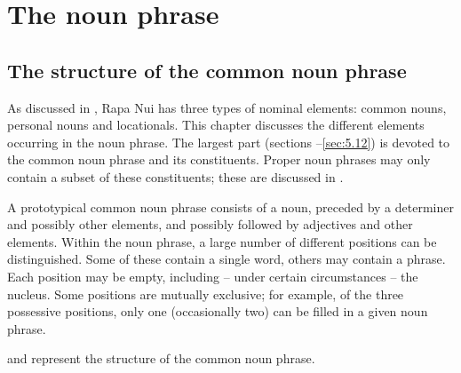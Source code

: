 \chapter[The noun phrase]{The noun phrase}\label{ch:5}
\section{The structure of the common noun phrase}\label{sec:5.1}
As discussed in , Rapa Nui has three types of nominal elements: common nouns, personal nouns and locationals. This chapter discusses the different elements occurring in the noun phrase. The largest part (sections –\ref{sec:5.12}) is devoted to the common noun phrase and its constituents. Proper noun phrases may only contain a subset of these constituents; these are discussed in . 

A prototypical common noun phrase consists of a noun, preceded by a determiner and possibly other elements, and possibly followed by adjectives and other elements. Within the noun phrase, a large number of different positions can be distinguished. Some of these contain a single word, others may contain a phrase. Each position may be empty, including – under certain circumstances – the nucleus. Some positions are mutually exclusive; for example, of the three possessive positions, only one (occasionally two) can be filled in a given noun phrase.

 and  represent the structure of the common noun phrase. 

